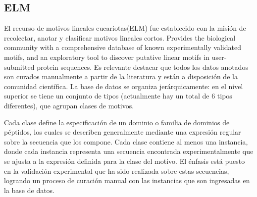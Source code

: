 



\subsection{ELM}\label{elm}

El recurso de motivos lineales eucariotas(ELM) \cite{puntervoll2003elm,dinkel2013eukaryotic} fue establecido con la misión de recolectar, anotar y clasificar motivos lineales cortos. 
Provides the biological community with a comprehensive database of known experimentally validated motifs, and an exploratory tool to discover putative linear motifs in user-submitted protein sequences.
Es relevante destacar que todos los datos anotados son curados manualmente a partir de la literatura y están a disposición de la comunidad científica.
La base de datos se organiza jerárquicamente: en el nivel superior se tiene un conjunto de tipos (actualmente hay un total de 6 tipos diferentes), que agrupan clases de motivos. 

Cada clase define la especificación de un dominio o familia de dominios de péptidos, los cuales se describen generalmente mediante una expresión regular sobre la secuencia que los compone.
Cada clase contiene al menos una instancia, donde cada instancia representa una secuencia encontrada experimentalmente que se ajusta a la expresión definida para la clase del motivo.
El énfasis está puesto en la validación experimental que ha sido realizada sobre estas secuencias, logrando un proceso de curación manual con las instancias que son ingresadas en la base de datos. 


